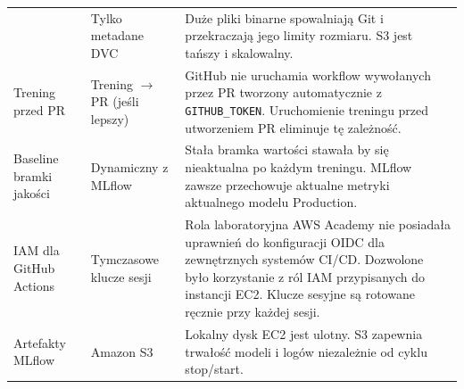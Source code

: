 \begin{longtable}{p{3.5cm}p{3.2cm}p{8.5cm}}
  & Tylko \newline metadane DVC
  & Duże pliki binarne spowalniają Git i przekraczają jego limity rozmiaru. S3 jest tańszy i skalowalny. \\
\addlinespace
Trening przed PR
  & Trening $\rightarrow$ PR \newline (jeśli lepszy)
  & GitHub nie uruchamia workflow wywołanych przez PR tworzony automatycznie z \texttt{GITHUB\_TOKEN}. Uruchomienie treningu przed utworzeniem PR eliminuje tę zależność. \\
\addlinespace
Baseline bramki \newline jakości
  & Dynamiczny \newline z MLflow
  & Stała bramka wartości stawała by się nieaktualna po każdym treningu. MLflow zawsze przechowuje aktualne metryki aktualnego modelu Production. \\
\addlinespace
IAM dla GitHub \newline Actions
  & Tymczasowe klucze sesji
  & Rola laboratoryjna AWS Academy nie posiadała uprawnień do konfiguracji OIDC dla zewnętrznych systemów CI/CD. Dozwolone było korzystanie z ról IAM przypisanych do instancji EC2. Klucze sesyjne są rotowane ręcznie przy każdej sesji. \\
\addlinespace
Artefakty MLflow
  & Amazon S3
  & Lokalny dysk EC2 jest ulotny. S3 zapewnia trwałość modeli i logów niezależnie od cyklu stop/start. \\
\end{longtable}